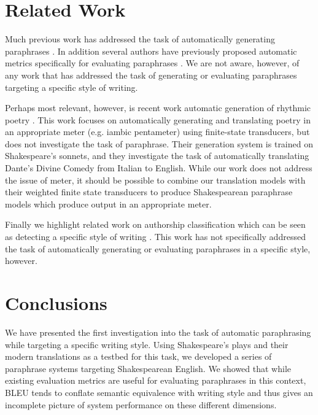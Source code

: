 \documentclass[10pt,a5paper,twoside]{article}
\begin{document}
\section{Related Work}
Much previous work has addressed the task of automatically generating paraphrases \cite{Barzilay03,dolan04,Shinyama03,Das09,bannard05,Callison-Burch08,Kok10}.  
In addition several authors have previously proposed 
automatic metrics specifically for evaluating paraphrases \cite{chen11,Callison-Burch08b,liu10}.
We are not aware, however, of any work that has addressed the task of generating or evaluating
paraphrases targeting a specific style of writing.

Perhaps most relevant, however, is recent work automatic generation of rhythmic poetry \cite{Greene10}.  This work focuses on automatically generating and translating
poetry in an appropriate meter (e.g. iambic pentameter) using finite-state transducers, but does not investigate the task of paraphrase.  Their generation system
is trained on Shakespeare's sonnets, and they investigate the task of automatically translating Dante's Divine Comedy from Italian to English.
While our work does not address the issue of meter, it should be possible to combine our translation
models with their weighted finite state transducers to produce Shakespearean paraphrase models which produce output in an appropriate meter.

Finally we highlight related work on authorship classification which can be seen as detecting a specific style of writing \cite{Gamon04,Raghavan10}.
This work has not specifically addressed the task of automatically generating or evaluating paraphrases in a specific style, however.

\section{Conclusions}
We have presented the first investigation into the task of automatic paraphrasing while targeting a specific writing style.  Using Shakespeare's plays and their
modern translations as a testbed for this task, we developed a series of paraphrase systems targeting Shakespearean English.  We showed that while existing evaluation
metrics are useful for evaluating paraphrases in this context, BLEU tends to conflate semantic equivalence with writing style and thus gives an incomplete picture of 
system performance on these different dimensions.
\end{document}
